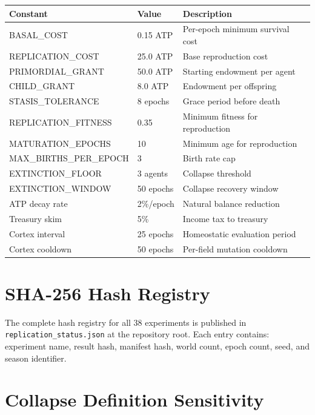 \documentclass[11pt,a4paper]{article}
\begin{document}
\begin{table}[H]
\centering
\small
\begin{tabular}{@{}lll@{}}
\toprule
Constant & Value & Description \\
\midrule
BASAL\_COST & 0.15 ATP & Per-epoch minimum survival cost \\
REPLICATION\_COST & 25.0 ATP & Base reproduction cost \\
PRIMORDIAL\_GRANT & 50.0 ATP & Starting endowment per agent \\
CHILD\_GRANT & 8.0 ATP & Endowment per offspring \\
STASIS\_TOLERANCE & 8 epochs & Grace period before death \\
REPLICATION\_FITNESS & 0.35 & Minimum fitness for reproduction \\
MATURATION\_EPOCHS & 10 & Minimum age for reproduction \\
MAX\_BIRTHS\_PER\_EPOCH & 3 & Birth rate cap \\
EXTINCTION\_FLOOR & 3 agents & Collapse threshold \\
EXTINCTION\_WINDOW & 50 epochs & Collapse recovery window \\
ATP decay rate & 2\%/epoch & Natural balance reduction \\
Treasury skim & 5\% & Income tax to treasury \\
Cortex interval & 25 epochs & Homeostatic evaluation period \\
Cortex cooldown & 50 epochs & Per-field mutation cooldown \\
\bottomrule
\end{tabular}
\end{table}

\section{SHA-256 Hash Registry}\label{app:hashes}

The complete hash registry for all 38 experiments is published in \texttt{replication\_status.json} at the repository root. Each entry contains: experiment name, result hash, manifest hash, world count, epoch count, seed, and season identifier.

\section{Collapse Definition Sensitivity}\label{app:collapse-sensitivity}
\end{document}
